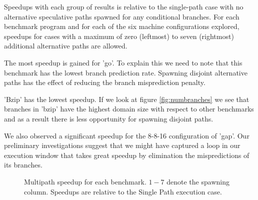 \documentclass[10pt,dvips]{article}
\begin{document}
Speedups with each group of results is relative to the
single-path case with no alternative speculative paths spawned
for any conditional branches.  For each benchmark program and
for each of the six machine configurations explored, speedups
for cases with a maximum
of zero (leftmost) to seven (rightmost) additional alternative 
paths are allowed.

The most speedup is gained for 'go'.  To explain this we need to note that 
this benchmark has the lowest branch prediction rate.  Spawning disjoint 
alternative paths has the effect of reducing the branch misprediction 
penalty.

'Bzip' has the lowest speedup.  If we look at figure
\ref{fig:numbranches}  we see that branches in 'bzip' have
the highest domain size with respect to other benchmarks and
as a result there is less opportunity for spawning
disjoint paths.

We also observed a significant speedup for the 8-8-16 configuration
of 'gap'.  Our preliminary investigations suggest
that we might have captured 
a loop in our execution window that takes great speedup by elimination
the mispredictions of its branches.

\begin{figure}
\vspace{0.2 in}
\setlength{\epsfxsize}{14cm}%
\centerline{}
\caption{ Multipath speedup for each benchmark.  $1-7$ denote the
spawning column. 
Speedups are relative to the Single Path execution case.}
\label{fig:figall}
\end{figure}
%
%
%
%
%
%
\end{document}

